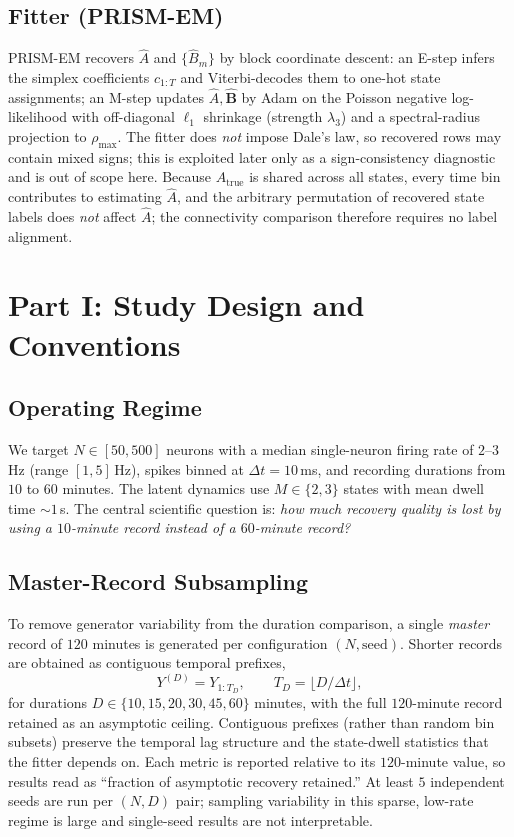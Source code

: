 \documentclass[11pt]{article}
\newcommand{\Atrue}{A_{\mathrm{true}}}
\newcommand{\Ahat}{\hat{A}}
\begin{document}
\subsection{Fitter (PRISM-EM)}
PRISM-EM recovers $\Ahat$ and $\{\hat B_m\}$ by block coordinate descent: an
E-step infers the simplex coefficients $c_{1:T}$ and Viterbi-decodes them to
one-hot state assignments; an M-step updates $\Ahat,\hat{\mathbf B}$ by Adam on
the Poisson negative log-likelihood with off-diagonal $\ell_1$ shrinkage
(strength $\lambda_3$) and a spectral-radius projection to $\rho_{\max}$. The
fitter does \emph{not} impose Dale's law, so recovered rows may contain mixed
signs; this is exploited later only as a sign-consistency diagnostic and is out
of scope here. Because $\Atrue$ is shared across all states, every time bin
contributes to estimating $\Ahat$, and the arbitrary permutation of recovered
state labels does \emph{not} affect $\Ahat$; the connectivity comparison
therefore requires no label alignment.

\section{Part I: Study Design and Conventions}
\label{sec:design}

\subsection{Operating Regime}
We target $N\in[50,500]$ neurons with a median single-neuron firing rate of
$2$--$3$\,Hz (range $[1,5]$\,Hz), spikes binned at $\Delta t = 10$\,ms, and
recording durations from $10$ to $60$ minutes. The latent dynamics use
$M\in\{2,3\}$ states with mean dwell time $\sim 1$\,s. The central scientific
question is: \emph{how much recovery quality is lost by using a $10$-minute
record instead of a $60$-minute record?}

\subsection{Master-Record Subsampling}
To remove generator variability from the duration comparison, a single
\emph{master} record of $120$ minutes is generated per configuration
$(N,\text{seed})$. Shorter records are obtained as contiguous temporal
prefixes,
\begin{equation}
  Y^{(D)} = Y_{1:T_D},\qquad T_D = \lfloor D/\Delta t\rfloor,
\end{equation}
for durations $D\in\{10,15,20,30,45,60\}$ minutes, with the full $120$-minute
record retained as an asymptotic ceiling. Contiguous prefixes (rather than
random bin subsets) preserve the temporal lag structure and the state-dwell
statistics that the fitter depends on. Each metric is reported relative to its
$120$-minute value, so results read as ``fraction of asymptotic recovery
retained.'' At least $5$ independent seeds are run per $(N,D)$ pair; sampling
variability in this sparse, low-rate regime is large and single-seed results
are not interpretable.
\end{document}
